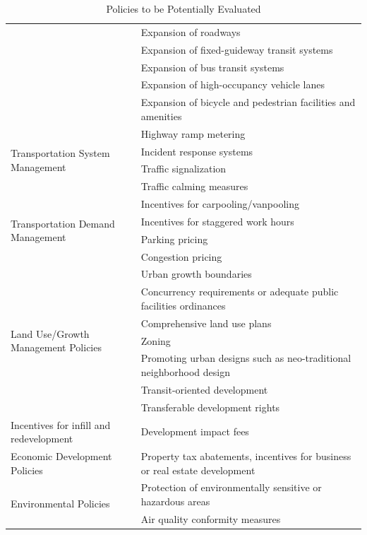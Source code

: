 \begin{table}[htp]
\caption{Policies to be Potentially Evaluated}
\label{tab:policies}
\begin{tabular}{ p{1.45in}  p{4.4in}  }
\addlinespace
\toprule[1.5pt]
\multirow{5}{3cm}{Transportation Capacity}
&   Expansion of roadways\\
&   Expansion of fixed-guideway transit systems\\
&   Expansion of bus transit systems\\
&   Expansion of high-occupancy vehicle lanes\\
&   Expansion of bicycle and pedestrian facilities and amenities\\
\midrule
\multirow{4}{3cm}{Transportation System Management}
&   Highway ramp metering\\
&   Incident response systems\\
&   Traffic signalization\\
&   Traffic calming measures\\
\midrule
\multirow{4}{3cm}{Transportation Demand Management}
&   Incentives for carpooling/vanpooling\\
&   Incentives for staggered work hours\\
&   Parking pricing\\
&   Congestion pricing\\
\midrule
\multirow{7}{3cm}{Land Use/Growth Management Policies}
&   Urban growth boundaries\\
&   Concurrency requirements or adequate public facilities ordinances\\
&   Comprehensive land use plans\\
&   Zoning\\
&   Promoting urban designs such as neo-traditional neighborhood design\\
&   Transit-oriented development\\
&   Transferable development rights\\
\midrule
Incentives for infill and redevelopment &
    Development impact fees\\
\midrule
Economic Development Policies &
    Property tax abatements, incentives for business or real estate development\\
\midrule
\multirow{2}{3cm}{Environmental Policies}
&   Protection of environmentally sensitive or hazardous areas\\
&   Air quality conformity measures\\
\bottomrule[1.5pt]
\end{tabular}
\end{table}

